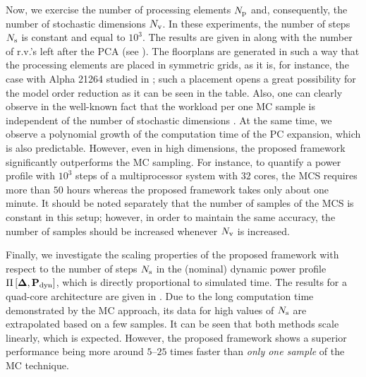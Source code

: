 
Now, we exercise the number of processing elements ${N_\text{p}}$ and, consequently, the number of stochastic dimensions ${N_\text{v}}$. In these experiments, the number of steps $N_\text{s}$ is constant and equal to $10^3$. The results are given in  along with the number of r.v.'s left after the PCA (see ). The floorplans are generated in such a way that the processing elements are placed in symmetric grids, as it is, for instance, the case with Alpha 21264 studied in \cite{juan2011}; such a placement opens a great possibility for the model order reduction as it can be seen in the table. Also, one can clearly observe in  the well-known fact that the workload per one MC sample is independent of the number of stochastic dimensions \cite{maitre2010}. At the same time, we observe a polynomial growth \cite{heiss2008} of the computation time of the PC expansion, which is also predictable. However, even in high dimensions, the proposed framework significantly outperforms the MC sampling. For instance, to quantify a power profile with $10^3$ steps of a multiprocessor system with $32$ cores, the MCS requires more than $50$ hours whereas the proposed framework takes only about one minute. It should be noted separately that the number of samples of the MCS is constant in this setup; however, in order to maintain the same accuracy, the number of samples should be increased whenever ${N_\text{v}}$ is increased.


Finally, we investigate the scaling properties of the proposed framework with respect to the number of steps $N_\text{s}$ in the (nominal) dynamic power profile $\prof{\mP_\dyn}$, which is directly proportional to simulated time. The results for a quad-core architecture are given in . Due to the long computation time demonstrated by the MC approach, its data for high values of $N_\text{s}$ are extrapolated based on a few samples. It can be seen that both methods scale linearly, which is expected. However, the proposed framework shows a superior performance being more around $5$--$25$ times faster than \emph{only one sample} of the MC technique.
